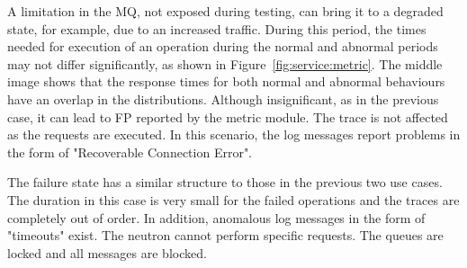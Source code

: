 A limitation in the MQ, not exposed during testing, can bring it to a degraded state, for example, due to an increased traffic. During this period, the times needed for execution of an operation during the normal and abnormal periods may not differ significantly, as shown in Figure~\ref{fig:service:metric}. The middle image shows that the response times for both normal and abnormal behaviours have an overlap in the distributions. Although insignificant, as in the previous case, it can lead to FP reported by the metric module. The trace is not affected as the requests are executed. In this scenario, the log messages report problems in the form of "Recoverable Connection Error". 

The failure state has a similar structure to those in the previous two use cases. The duration in this case is very small for the failed operations and the traces are completely out of order. In addition, anomalous log messages in the form of "timeouts" exist. The neutron cannot perform specific requests. The queues are locked and all messages are blocked. 



